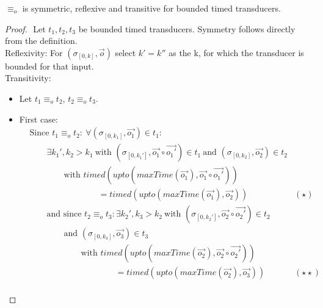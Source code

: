 \begin{lemma}[name=Observational Equivalence is an Equivalence Relationship for Bounded Transducers]\label{lemma:observational_equivalence_equivalence_relationship}
  \(\equiv_o\) is symmetric, reflexive and transitive for bounded timed transducers.
\end{lemma}
\begin{proof}$ $\newline
  Let \(t_1, t_2, t_3\) be bounded timed transducers.
  Symmetry follows directly from the definition.\\
  Reflexivity: For \((\sigma_{[0,k]}, \vec{o})\) select \(k' = k''\) as the k, for which the transducer is bounded for that input.\\
  Transitivity:
  \begin{itemize}
    \item Let \(t_1 \equiv_o t_2\), \(t_2 \equiv_o t_3\).
    \item First case:
      \begin{align*}
        &\text{Since } t_1 \equiv_o t_2:\ \forall (\sigma_{[0,k_1]}, \vec{o_1}) \in t_1: \\
        &\hspace{2em} \exists k_1', k_2 > k_1\ \text{with } (\sigma_{[0,k_1']}, \vec{o_1}\circ\vec{o_1'}) \in t_1\ \text{and } (\sigma_{[0,k_2]}, \vec{o_2}) \in t_2 \\
        &\hspace{4em} \text{with } \mathit{timed}(\mathit{upto}(\mathit{maxTime}(\vec{o_1}),\vec{o_1} \circ \vec{o_1'} )) \\
        &\hspace{8em} = \mathit{timed}(\mathit{upto}(\mathit{maxTime}(\vec{o_1}),\vec{o_2})) & (\star)\\
        &\hspace{2em} \text{and since } t_2 \equiv_o t_3: \exists k_2', k_3 > k_2\ \text{with } (\sigma_{[0,k_2']}, \vec{o_2}\circ\vec{o_2'}) \in t_2 \\
        &\hspace{4em} \text{and } (\sigma_{[0,k_3]}, \vec{o_3}) \in t_3 \\
        &\hspace{6em} \text{with } \mathit{timed}(\mathit{upto}(\mathit{maxTime}(\vec{o_2}),\vec{o_2} \circ \vec{o_2'} )) \\
        &\hspace{10em} = \mathit{timed}(\mathit{upto}(\mathit{maxTime}(\vec{o_2}),\vec{o_3})) & (\star\star)\\

\end{align*}
\end{itemize}
\end{proof}
